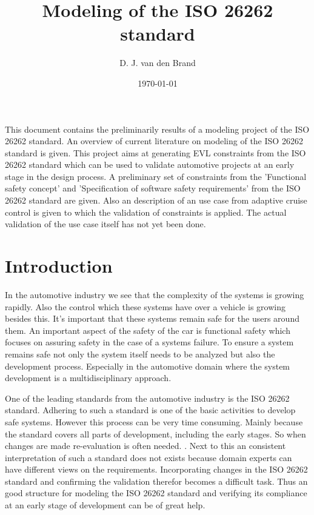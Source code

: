 \documentclass[a4paper]{article}
\title{Modeling of the ISO 26262 standard}
\author{{D. J. van den Brand}}
\date{\today}
\newcommand{\ISO}{ISO 26262 standard\xspace}
\renewenvironment{abstract}
 {\small
  \begin{center}
  \bfseries \abstractname\vspace{-.5em}\vspace{0pt}
  \end{center}
  \list{}{
    \setlength{\leftmargin}{3cm}%
    \setlength{\rightmargin}{3cm}%
  }%
  \item\relax}
 {\endlist}
\begin{document}
\maketitle

\begin{abstract}
This document contains the preliminarily results of a modeling project of the \ISO.
An overview of current literature on modeling of the \ISO is given.
This project aims at generating EVL constraints from the \ISO which can be used to validate automotive projects at an early stage in the design process.
A preliminary set of constraints from the 'Functional safety concept' and 'Specification of software safety requirements' from the \ISO are given.
Also an description of an use case from adaptive cruise control is given to which the validation of constraints is applied.
The actual validation of the use case itself has not yet been done.
\end{abstract}

\section{Introduction} \label{sec:introduction}
In the automotive industry we see that the complexity of the systems is growing rapidly.
Also the control which these systems have over a vehicle is growing besides this.
It's important that these systems remain safe for the users around them.
An important aspect of the safety of the car is functional safety which focuses on assuring safety in the case of a systems failure.
To ensure a system remains safe not only the system itself needs to be analyzed but also the development process.
Especially in the automotive domain where the system development is a multidisciplinary approach.

One of the leading standards from the automotive industry is the \ISO \cite{InternationalOrganizationforStandardization2009}. %
Adhering to such a standard is one of the basic activities to develop safe systems.
However this process can be very time consuming.
Mainly because the standard covers all parts of development, including the early stages.
So when changes are made re-evaluation is often needed. \cite{LUNA-82}.
Next to this an consistent interpretation of such a standard does not exists because domain experts can have different views on the requirements.
Incorporating changes in the \ISO and confirming the validation therefor becomes a difficult task.
Thus an good structure for modeling the \ISO and verifying its compliance at an early stage of development can be of great help.
\end{document}
